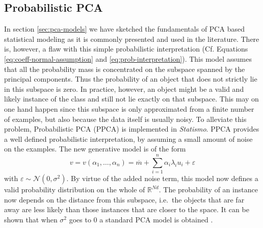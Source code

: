 \documentclass{InsightArticle}
\newcommand{\Statismo}{\emph{Statismo}\xspace}
\def\R{\mathds{R}} %
\begin{document}

\subsection{Probabilistic PCA}
In section \ref{sec:pca-models} we have sketched the fundamentals of
PCA based statistical modeling as it is commonly presented and used in the
literature.  There is, however, a flaw with this simple probabilistic
interpretation (Cf. Equations \eqref{eq:coeff-normal-assumption} and
\eqref{eq:prob-interpretation}).  This model assumes that all the
probability mass is concentrated on the subspace spanned by the
principal components.  Thus the probability of an object that does
not strictly lie in this subspace is zero. In practice, however, an object might be a valid and likely instance of the class and 
still not lie exactly on that subspace. This may on one hand happen since this subspace is only approximated from a finite number of examples, 
but also because the data itself is usually noisy.
 To alleviate this
problem, Probabilistic PCA (PPCA) \cite{tipping_probabilistic_1999} is implemented in \Statismo.
PPCA  provides a well defined probabilistic interpretation, by assuming
a small amount of noise on the examples. The new generative
model is of the form
\[
v = v(\alpha_1, \ldots, \alpha_n) = \overline{m}  + \sum_{i=1}^n \alpha_i \lambda_i u_i + \varepsilon
\]
with $\varepsilon \sim \mathcal{N}(0, \sigma^2)$.  By virtue of the
added noise term, this model now defines a valid probability distribution
on the whole of $\R^{Nd}$. The probability of an instance now depends
on the distance from this subspace, i.e.\ the objects that are far away are less
likely than those instances that are closer to the space.  It can be
shown that when $\sigma^2$ goes to $0$ a standard PCA model is
obtained \cite{roweis_em_1998}.
\end{document}
